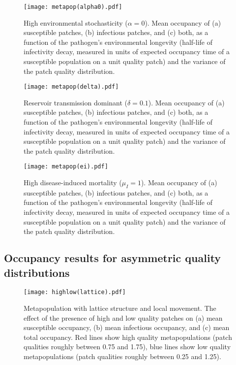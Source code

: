 \documentclass{svjour3}
\begin{document}
\begin{figure}[h!]
\centering
\texttt{[image: metapop(alpha0).pdf]}
\caption{High environmental stochasticity ($\alpha = 0$).  Mean occupancy of (a) susceptible patches, (b) infectious patches, and (c) both, as a function of the pathogen's environmental longevity (half-life of infectivity decay, measured in units of expected occupancy time of a susceptible population on a unit quality patch) and the variance of the patch quality distribution.}
\label{poutcome_x0}
\end{figure}   

\begin{figure}[h!]
\centering
\texttt{[image: metapop(delta).pdf]}
\caption{Reservoir transmission dominant ($\delta = 0.1$).  Mean occupancy of (a) susceptible patches, (b) infectious patches, and (c) both, as a function of the pathogen's environmental longevity (half-life of infectivity decay, measured in units of expected occupancy time of a susceptible population on a unit quality patch) and the variance of the patch quality distribution.}
\label{poutcome_delta}
\end{figure}   

\begin{figure}[h!]
\centering
\texttt{[image: metapop(ei).pdf]}
\caption{High disease-induced mortality ($\mu_I = 1$).  Mean occupancy of (a) susceptible patches, (b) infectious patches, and (c) both, as a function of the pathogen's environmental longevity (half-life of infectivity decay, measured in units of expected occupancy time of a susceptible population on a unit quality patch) and the variance of the patch quality distribution.}
\label{poutcome_ei}
\end{figure}   

\clearpage

\subsection{Occupancy results for asymmetric quality distributions}

\begin{figure}[h!]
\centering
\texttt{[image: highlow(lattice).pdf]}
\caption{Metapopulation with lattice structure and local movement.  The effect of the presence of high and low quality patches on (a) mean susceptible occupancy, (b) mean infectious occupancy, and (c) mean total occupancy.  Red lines show high quality metapopulations (patch qualities roughly between 0.75 and 1.75), blue lines show low quality metapopulations (patch qualities roughly between 0.25 and 1.25).}
\label{sens_lattice}
\end{figure}
\end{document}
